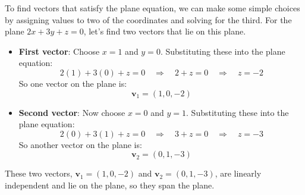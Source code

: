 \documentclass{report}
\begin{document}
\begin{itemize}
            To find vectors that satisfy the plane equation, we can make some simple choices by assigning values to two of the coordinates and solving for the third.
            \bigbreak \noindent 
            For the plane \( 2x + 3y + z = 0 \), let's find two vectors that lie on this plane.
            \begin{itemize}
                \item \textbf{First vector}: Choose \( x = 1 \) and \( y = 0 \).
                    Substituting these into the plane equation:
                    \[
                        2(1) + 3(0) + z = 0 \quad \Rightarrow \quad 2 + z = 0 \quad \Rightarrow \quad z = -2
                    \]
                    So one vector on the plane is:
                    \[
                        \mathbf{v}_1 = (1, 0, -2)
                    \]
                \item \textbf{Second vector}: Now choose \( x = 0 \) and \( y = 1 \).
                    Substituting these into the plane equation:
                    \[
                        2(0) + 3(1) + z = 0 \quad \Rightarrow \quad 3 + z = 0 \quad \Rightarrow \quad z = -3
                    \]
                    So another vector on the plane is:
                    \[
                        \mathbf{v}_2 = (0, 1, -3)
                    \]
            \end{itemize}
            These two vectors, \(\mathbf{v}_1 = (1, 0, -2)\) and \(\mathbf{v}_2 = (0, 1, -3)\), are linearly independent and lie on the plane, so they span the plane.


\end{itemize}
\end{document}
